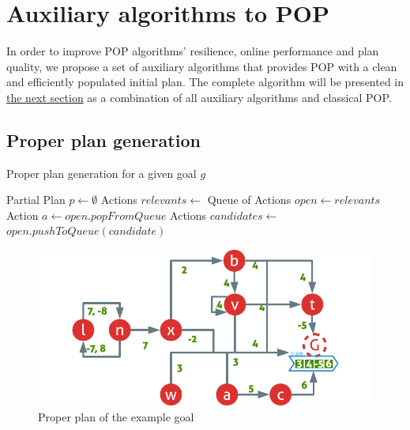 \documentclass[]{article}
\begin{document}
\section{Auxiliary algorithms to POP}\label{auxiliary-algorithms-to-pop}

In order to improve POP algorithms' resilience, online performance and
plan quality, we propose a set of auxiliary algorithms that provides POP
with a clean and efficiently populated initial plan. The complete
algorithm will be presented in \protect\hyperlink{soda}{the next
section} as a combination of all auxiliary algorithms and classical POP.

\subsection{Proper plan generation}\label{proper-plan-generation}

\begin{algorithm}\caption{Proper plan generation for a given goal $g$}\label{properplan}\begin{algorithmic}[1]

\footnotesize
{} \State Partial Plan
\(p \gets \emptyset\) \State Actions \(relevants \gets\)
\State {}
\State Queue of Actions \(open \gets relevants\)
 \State Action \(a\gets open.popFromQueue\)
\State Actions \(candidates \gets\) 
 
\State \(open.pushToQueue(candidate)\) \EndIf
        \EndFor
    \EndWhile
\EndFunction

\end{algorithmic}\end{algorithm}

\begin{figure}[htbp]
\centering
\includegraphics{graphics/proper.pdf}
\caption{Proper plan of the example goal\label{fig:proper}}
\end{figure}
\end{document}
